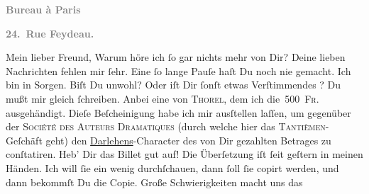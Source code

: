 \begin{ledgroupsized}[t]{13cm}
           \pstart
           \begin{otherlanguage}{french}\textcolor{gray}{\textbf{\textbf{Bureau à Paris}}}\end{otherlanguage}\pend
           \pstart
           \begin{otherlanguage}{french}\textcolor{gray}{\textbf{\textbf{24. Rue Feydeau.}}}\end{otherlanguage}\pend
           \pstart\center{}Mein lieber Freund,\pend\pstart
           Warum höre ich ſo gar nichts mehr von Dir? Deine lieben Nachrichten fehlen mir ſehr.
               Eine ſo lange Pauſe haſt Du noch nie gemacht. Ich bin in Sorgen. Biſt Du unwohl? Oder
               iſt Dir ſonſt etwas Verſtimmendes \label{K_L02787-1v}\label{K_L02787-1h}? Du mußt mir gleich ſchreiben.\pend
           \pstart
           Anbei eine \label{K_L02787-2v}\label{K_L02787-2h} von \textsc{Thorel}, dem ich die 500 \textsc{Fr.} ausgehändigt. Dieſe
               Beſcheinigung habe ich mir ausſtellen laſſen, um gegenüber der \textsc{Société des Auteurs Dramatiques} (durch welche hier das \textsc{Tantièmen}-Geſchäft geht) {\pb}den \uline{Darlehens}-Character des von Dir gezahlten Betrages zu conſtatiren. Heb’ Dir das
               Billet gut auf!\pend
           \pstart
           Die Überſetzung iſt ſeit geſtern in meinen Händen. Ich will ſie ein wenig
               durchſchauen, dann ſoll ſie copirt werden, und dann bekommſt Du die Copie. Große
               Schwierigkeiten macht uns das \label{K_L02787-3v}
\end{ledgroupsized}
